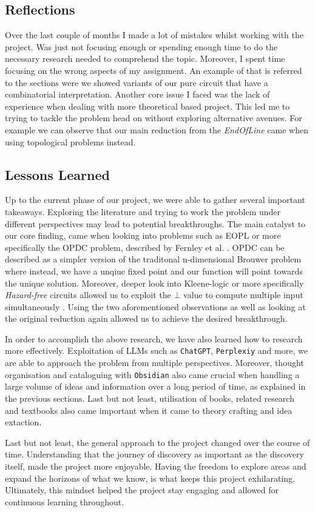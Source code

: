 \subsection{Reflections}

Over the last couple of months I made a lot of mistakes whilst working with the project.
Was just not focusing enough or spending enough time to do the necessary research needed
to comprehend the topic. Moreover, I spent time focusing on the wrong aspects of my assignment.
An example of that is referred to the sections were we showed variants of our pure circuit
that have a combinatorial interpretation. Another core issue I faced was the lack
of experience when dealing with more theoretical based project. This led me to
trying to tackle the problem head on without exploring alternative avenues. For example 
we can observe that our main reduction from the \textit{EndOfLine} came
when using topological problems instead. 

\subsection{Lessons Learned}

Up to the current phase of our project, we were able to gather several important takeaways.
Exploring the literature and trying to work the problem under different perspectives
may lead to potential breakthroughs. The main catalyst to our core finding, came
when looking into problems such as \textsc{EOPL} or more specifically
the \textsc{OPDC} problem, described by Fernley et al. \cite{fearnleyUniqueEndPotential2020}.
\textsc{OPDC} can be described as a simpler version of the traditonal n-dimensional Brouwer problem
where instead, we have a unqiue fixed point and our function will point towards the unique solution.
Moreover, deeper look into Kleene-logic or more specifically \textit{Hazard-free} circuits allowed
us to exploit the $\bot$ value to compute multiple input simultaneously \cite{ikenmeyerComplexityHazardfreeCircuits2019}.
Using the two aforementioned observations as well as looking at the original reduction again allowed us to achieve
the desired breakthrough.

In order to accomplish the above research, we have also learned how to research more effectively.
Exploitation of LLMs such as \texttt{ChatGPT}, \texttt{Perplexiy} and more, we are able to
approach the problem from multiple perspectives. Moreover, thought organisation and cataloguing with
\texttt{Obsidian}
also came crucial when handling a large volume of ideas and information over a long period of time,
as explained in the previous sections. Last but not least, utilisation of books,
related research and textbooks also came important when it came to theory crafting and idea extaction.

Last but not least, the general approach to the project changed over the course of time.
Understanding that the journey of discovery as important as the discovery itself,
made the project more enjoyable. Having the freedom to explore areas and expand
the horizons of what we know, is what keeps this project exhilarating.
Ultimately, this mindset helped the project stay engaging and allowed for continuous learning throughout.





